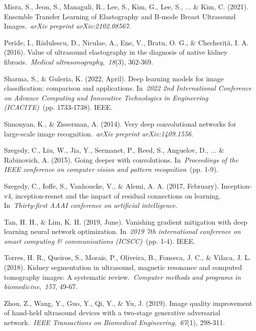 \documentclass[
]{article}
\begin{document}
Misra, S., Jeon, S., Managuli, R., Lee, S., Kim, G., Lee, S., ... \&
Kim, C. (2021). Ensemble Transfer Learning of Elastography and B-mode
Breast Ultrasound Images.~\emph{arXiv preprint arXiv:2102.08567}.

Peride, I., Rădulescu, D., Niculae, A., Ene, V., Bratu, O. G., \&
Checheriță, I. A. (2016). Value of ultrasound elastography in the
diagnosis of native kidney fibrosis.~\emph{Medical
ultrasonography},~\emph{18}(3), 362-369.

Sharma, S., \& Guleria, K. (2022, April). Deep learning models for image
classification: comparison and applications. In~\emph{2022 2nd
International Conference on Advance Computing and Innovative
Technologies in Engineering (ICACITE)}~(pp. 1733-1738). IEEE.

Simonyan, K., \& Zisserman, A. (2014). Very deep convolutional networks
for large-scale image recognition.~\emph{arXiv preprint
arXiv:1409.1556}.

Szegedy, C., Liu, W., Jia, Y., Sermanet, P., Reed, S., Anguelov, D., ...
\& Rabinovich, A. (2015). Going deeper with convolutions.
In~\emph{Proceedings of the IEEE conference on computer vision and
pattern recognition}~(pp. 1-9).

Szegedy, C., Ioffe, S., Vanhoucke, V., \& Alemi, A. A. (2017, February).
Inception-v4, inception-resnet and the impact of residual connections on
learning. In~\emph{Thirty-first AAAI conference on artificial
intelligence}.

Tan, H. H., \& Lim, K. H. (2019, June). Vanishing gradient mitigation
with deep learning neural network optimization. In~\emph{2019 7th
international conference on smart computing \& communications
(ICSCC)}~(pp. 1-4). IEEE.

Torres, H. R., Queiros, S., Morais, P., Oliveira, B., Fonseca, J. C., \&
Vilaca, J. L. (2018). Kidney segmentation in ultrasound, magnetic
resonance and computed tomography images: A systematic
review.~\emph{Computer methods and programs in biomedicine},~\emph{157},
49-67.

Zhou, Z., Wang, Y., Guo, Y., Qi, Y., \& Yu, J. (2019). Image quality
improvement of hand-held ultrasound devices with a two-stage generative
adversarial network.~\emph{IEEE Transactions on Biomedical
Engineering},~\emph{67}(1), 298-311.
\end{document}
